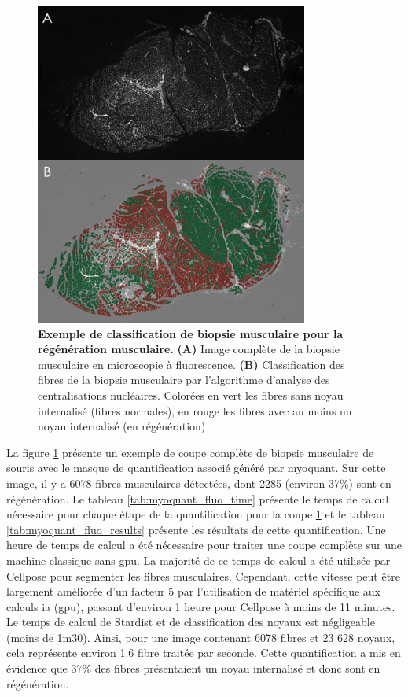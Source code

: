 \begin{figure}[htbp]
 \centering
 \includegraphics[width=0.8\textwidth]{figures/fluo_nuc.png}
 \caption[Exemple de classification de biopsie musculaire pour la régénération musculaire]{\textbf{Exemple de classification de biopsie musculaire pour la régénération musculaire.} \textbf{(A)} Image complète de la biopsie musculaire en microscopie à fluorescence.\textbf{ (B)} Classification des fibres de la biopsie musculaire par l'algorithme d'analyse des centralisations nucléaires. Colorées en vert les fibres sans noyau internalisé (fibres normales), en rouge les fibres avec au moins un noyau internalisé (en régénération)}
 \label{fig:fluo_paint}
\end{figure}

La figure \ref{fig:fluo_paint} présente un exemple de coupe complète de biopsie musculaire de souris avec le masque de quantification associé généré par \gls{myoquant}. Sur cette image, il y a 6078 fibres musculaires détectées, dont 2285 (environ 37\%) sont en régénération. Le tableau \ref{tab:myoquant_fluo_time} présente le temps de calcul nécessaire pour chaque étape de la quantification pour la coupe \ref{fig:fluo_paint} et le tableau \ref{tab:myoquant_fluo_results} présente les résultats de cette quantification. Une heure de temps de calcul a été nécessaire pour traiter une coupe complète sur une machine classique sans \gls{gpu}. La majorité de ce temps de calcul a été utilisée par Cellpose pour segmenter les fibres musculaires. Cependant, cette vitesse peut être largement améliorée d'un facteur 5 par l'utilisation de matériel spécifique aux calculs \gls{ia} (\gls{gpu}), passant d’environ 1 heure pour Cellpose à moins de 11 minutes. Le temps de calcul de Stardist et de classification des noyaux est négligeable (moins de 1m30). Ainsi, pour une image contenant 6078 fibres et 23 628 noyaux, cela représente environ 1.6 fibre traitée par seconde. Cette quantification a mis en évidence que 37\% des fibres présentaient un noyau internalisé et donc sont en régénération.

